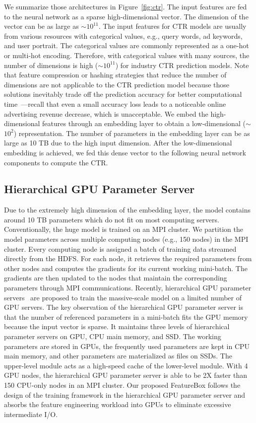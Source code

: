 \documentclass[sigconf]{acmart}
\begin{document}
We summarize those architectures in Figure~\ref{fig:ctr}. The input features are fed to the neural network as a sparse high-dimensional vector. The dimension of the vector can be as large as $\sim$$10^{11}$. The input features for CTR models are usually from various resources with categorical values, e.g., query words, ad keywords, and user portrait. The categorical values are commonly represented as a one-hot or multi-hot encoding. Therefore, with categorical values with many sources, the number of dimensions is high ($\sim$$10^{11}$) for industry CTR prediction models. Note that feature compression or hashing strategies that reduce the number of dimensions are not applicable to the CTR prediction model because those solutions inevitably trade off the prediction accuracy for better computational time~\cite{Article:Goemans_JACM95,Proc:Weinberger_ICML09,deng2021deeplight}---recall that even a small accuracy loss leads to a noticeable online advertising revenue decrease, which is unacceptable. We embed the high-dimensional features through an embedding layer to obtain a low-dimensional ($\sim$$10^2$) representation. The number of parameters in the embedding layer can be as large as 10 TB due to the high input dimension. After the low-dimensional embedding is achieved, we fed this dense vector to the following neural network components to compute the CTR. 

\subsection{Hierarchical GPU Parameter Server}
Due to the extremely high dimension of the embedding layer, the model contains around 10 TB parameters which do not fit on most computing servers. Conventionally, the huge model is trained on an MPI cluster. We partition the model parameters across multiple computing nodes (e.g., 150 nodes) in the MPI cluster. Every computing node is assigned a batch of training data streamed directly from the HDFS. 
For each node, it retrieves the required parameters from other nodes and computes the gradients for its current working mini-batch. The gradients are then updated to the nodes that maintain the corresponding parameters through MPI communications. Recently, hierarchical GPU parameter servers~\cite{Proc:Zhao_MLSys20} are proposed to train the massive-scale model on a limited number of GPU servers. The key observation of the hierarchical GPU parameter server is that the number of referenced parameters in a mini-batch fits the GPU memory because the input vector is sparse. It maintains three levels of hierarchical parameter servers on GPU, CPU main memory, and SSD. The working parameters are stored in GPUs, the frequently used parameters are kept in CPU main memory, and other parameters are materialized as files on SSDs. The upper-level module acts as a high-speed cache of the lower-level module. With 4 GPU nodes, the hierarchical GPU parameter server is able to be 2X faster than 150 CPU-only nodes in an MPI cluster. Our proposed FeatureBox follows the design of the training framework in the hierarchical GPU parameter server and absorbs the feature engineering workload into GPUs to eliminate excessive intermediate I/O.
\end{document}
